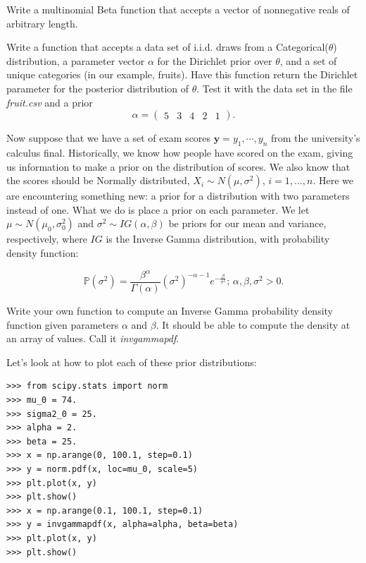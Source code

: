 \begin{problem}
Write a multinomial Beta function that accepts a vector of nonnegative reals of arbitrary length.
\end{problem}

\begin{problem}
Write a function that accepts a data set of i.i.d. draws from a Categorical($\theta$) distribution, a parameter vector $\alpha$ for the Dirichlet prior over $\theta$, and a set of unique categories (in our example, fruits). Have this function return the Dirichlet parameter for the posterior distribution of $\theta$. Test it with the data set in the file \emph{fruit.csv} and a prior $$\alpha = \left( \begin{array}{ccccc} 5 & 3 & 4 & 2 & 1 \end{array} \right).$$
\end{problem}

Now suppose that we have a set of exam scores $\mathbf{y} = y_{1}, \cdots, y_{n}$ from the university's calculus final. Historically, we know how people have scored on the exam, giving us information to make a prior on the distribution of scores. We also know that the scores should be Normally distributed, $X_i \sim N(\mu,\sigma^2)$, $i=1,...,n$. Here we are encountering something new: a prior for a distribution with two parameters instead of one. What we do is place a prior on each parameter. We let $\mu \sim N(\mu_{0}, \sigma_{0}^{2})$ and $\sigma^{2} \sim IG(\alpha, \beta)$ be priors for our mean and variance, respectively, where $IG$ is the Inverse Gamma distribution, with probability density function:

$$\mathbb{P}(\sigma^{2}) = \frac{\beta^{\alpha}}{\Gamma(\alpha)}(\sigma^{2})^{-\alpha - 1}e^{-\frac{\beta}{\sigma^{2}}}\text{; } \alpha,\beta,\sigma^2 >0.$$

\begin{problem}
Write your own function to compute an Inverse Gamma probability density function given parameters $\alpha$ and $\beta$. It should be able to compute the density at an array of values. Call it \emph{invgammapdf}.
\end{problem}

Let's look at how to plot each of these prior distributions:

\begin{lstlisting}
>>> from scipy.stats import norm
>>> mu_0 = 74.
>>> sigma2_0 = 25.
>>> alpha = 2.
>>> beta = 25.
>>> x = np.arange(0, 100.1, step=0.1)
>>> y = norm.pdf(x, loc=mu_0, scale=5)
>>> plt.plot(x, y)
>>> plt.show()
>>> x = np.arange(0.1, 100.1, step=0.1)
>>> y = invgammapdf(x, alpha=alpha, beta=beta)
>>> plt.plot(x, y)
>>> plt.show()
\end{lstlisting}

